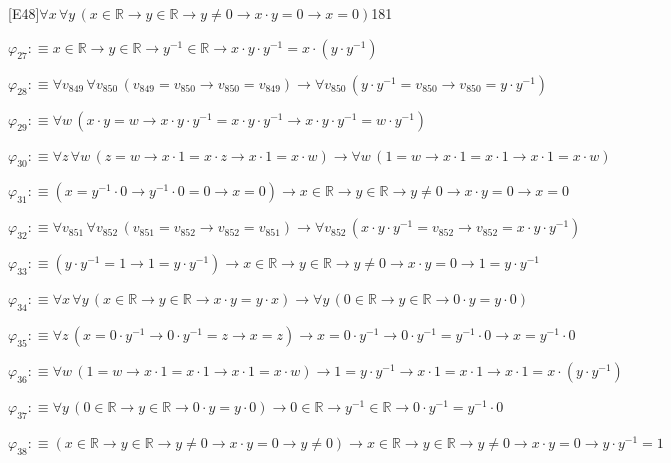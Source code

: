 \begin{fullproof}{[E48]}{$\forall x\,\forall y\,(x \in \mathbb{R} \to y \in \mathbb{R} \to y \neq 0 \to x \cdot y = 0 \to x = 0)$}{181}
\begin{abbrevlist}
\item $\varphi_{27} :\equiv x \in \mathbb{R} \to y \in \mathbb{R} \to y^{-1} \in \mathbb{R} \to x \cdot y \cdot y^{-1} = x \cdot (y \cdot y^{-1})$
\item $\varphi_{28} :\equiv \forall v_{849}\,\forall v_{850}\,(v_{849} = v_{850} \to v_{850} = v_{849}) \to \forall v_{850}\,(y \cdot y^{-1} = v_{850} \to v_{850} = y \cdot y^{-1})$
\item $\varphi_{29} :\equiv \forall w\,(x \cdot y = w \to x \cdot y \cdot y^{-1} = x \cdot y \cdot y^{-1} \to x \cdot y \cdot y^{-1} = w \cdot y^{-1})$
\item $\varphi_{30} :\equiv \forall z\,\forall w\,(z = w \to x \cdot 1 = x \cdot z \to x \cdot 1 = x \cdot w) \to \forall w\,(1 = w \to x \cdot 1 = x \cdot 1 \to x \cdot 1 = x \cdot w)$
\item $\varphi_{31} :\equiv (x = y^{-1} \cdot 0 \to y^{-1} \cdot 0 = 0 \to x = 0) \to x \in \mathbb{R} \to y \in \mathbb{R} \to y \neq 0 \to x \cdot y = 0 \to x = 0$
\item $\varphi_{32} :\equiv \forall v_{851}\,\forall v_{852}\,(v_{851} = v_{852} \to v_{852} = v_{851}) \to \forall v_{852}\,(x \cdot y \cdot y^{-1} = v_{852} \to v_{852} = x \cdot y \cdot y^{-1})$
\item $\varphi_{33} :\equiv (y \cdot y^{-1} = 1 \to 1 = y \cdot y^{-1}) \to x \in \mathbb{R} \to y \in \mathbb{R} \to y \neq 0 \to x \cdot y = 0 \to 1 = y \cdot y^{-1}$
\item $\varphi_{34} :\equiv \forall x\,\forall y\,(x \in \mathbb{R} \to y \in \mathbb{R} \to x \cdot y = y \cdot x) \to \forall y\,(0 \in \mathbb{R} \to y \in \mathbb{R} \to 0 \cdot y = y \cdot 0)$
\item $\varphi_{35} :\equiv \forall z\,(x = 0 \cdot y^{-1} \to 0 \cdot y^{-1} = z \to x = z) \to x = 0 \cdot y^{-1} \to 0 \cdot y^{-1} = y^{-1} \cdot 0 \to x = y^{-1} \cdot 0$
\item $\varphi_{36} :\equiv \forall w\,(1 = w \to x \cdot 1 = x \cdot 1 \to x \cdot 1 = x \cdot w) \to 1 = y \cdot y^{-1} \to x \cdot 1 = x \cdot 1 \to x \cdot 1 = x \cdot (y \cdot y^{-1})$
\item $\varphi_{37} :\equiv \forall y\,(0 \in \mathbb{R} \to y \in \mathbb{R} \to 0 \cdot y = y \cdot 0) \to 0 \in \mathbb{R} \to y^{-1} \in \mathbb{R} \to 0 \cdot y^{-1} = y^{-1} \cdot 0$
\item $\varphi_{38} :\equiv (x \in \mathbb{R} \to y \in \mathbb{R} \to y \neq 0 \to x \cdot y = 0 \to y \neq 0) \to x \in \mathbb{R} \to y \in \mathbb{R} \to y \neq 0 \to x \cdot y = 0 \to y \cdot y^{-1} = 1$

\end{abbrevlist}
\end{fullproof}

